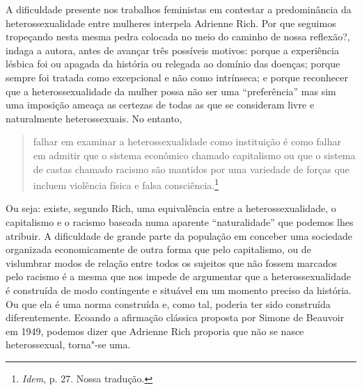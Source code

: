 A dificuldade presente nos trabalhos feministas em contestar a
predominância da heterossexualidade entre mulheres interpela Adrienne
Rich. Por que seguimos tropeçando nesta mesma pedra colocada no meio do
caminho de nossa reflexão?, indaga a autora, antes de avançar três
possíveis motivos: porque a experiência lésbica foi ou apagada da
história ou relegada ao domínio das doenças; porque sempre foi tratada
como excepcional e não como intrínseca; e porque reconhecer que a
heterossexualidade da mulher possa não ser uma ``preferência'' mas sim
uma imposição ameaça as certezas de todas as que se consideram livre e
naturalmente heterossexuais. No entanto,

\begin{quote}
falhar em examinar a heterossexualidade como instituição é como falhar
em admitir que o sistema econômico chamado capitalismo ou que o sistema
de castas chamado racismo são mantidos por uma variedade de forças que
incluem violência física e falsa consciência.\footnote{\emph{Idem}, p.
  27. Nossa tradução.}
\end{quote}

Ou seja: existe, segundo Rich, uma equivalência entre a
heterossexualidade, o capitalismo e o racismo baseada numa aparente
``naturalidade'' que podemos lhes atribuir. A dificuldade de grande
parte da população em conceber uma sociedade organizada economicamente
de outra forma que pelo capitalismo, ou de vislumbrar modos de relação
entre todos os sujeitos que não fossem marcados pelo racismo é a mesma
que nos impede de argumentar que a heterossexualidade é construída de
modo contingente e situável em um momento preciso da história. Ou que
ela é uma norma construída e, como tal, poderia ter sido construída
diferentemente. Ecoando a afirmação clássica proposta por Simone de
Beauvoir em 1949, podemos dizer que Adrienne Rich proporia que não se
nasce heterossexual, torna"-se uma.

